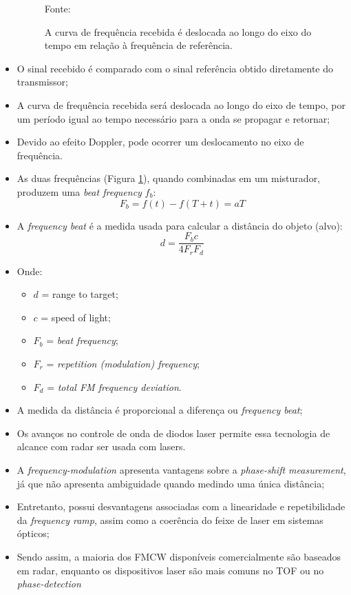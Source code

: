 \documentclass[xcolor=dvipsnames, aspectratio=169]{beamer}
\begin{document}
\begin{frame}
\begin{itemize}
\begin{figure}
            {Fonte: \cite{everett1995sensors}}
            \caption{A curva de frequência recebida é deslocada ao longo do eixo do tempo em relação à frequência de referência.}
            \label{fig:curva_de_freq}
        \end{figure}
        \item O sinal recebido é comparado com o sinal referência obtido diretamente do transmissor;
        \item A curva de frequência recebida será deslocada ao longo do eixo de tempo, por um período igual ao tempo necessário para a onda se propagar e retornar;
        \item Devido ao efeito Doppler, pode ocorrer um deslocamento no eixo de frequência.
        \item As duas frequências (Figura \ref{fig:curva_de_freq}), quando combinadas em um misturador, produzem uma \textit{beat frequency} $f_{b}$:
        \begin{equation}
            F_{b} = f(t) - f(T + t) = aT
        \end{equation}
        \item A \textit{frequency beat} é a medida usada para calcular a distância do objeto (alvo):
        \begin{equation}
            d = \frac{F_{b}c}{4F_{r}F{_d}}
        \end{equation}
        \item Onde:
        \begin{itemize}
            \item[] $d$ = range to target;
            \item[] $c$ = speed of light;
            \item[] $F_{b}$ = \textit{beat frequency};
            \item[] $F_{r}$ = \textit{repetition (modulation) frequency};
            \item[] $F_{d}$ = \textit{total FM frequency deviation}.
        \end{itemize}
        \item A medida da distância é proporcional a diferença ou \textit{frequency beat};
        \item Os avanços no controle de onda de diodos laser permite essa tecnologia de alcance com radar ser usada com lasers.
        \item A \textit{frequency-modulation} apresenta vantagens sobre a \textit{phase-shift measurement}, já que não apresenta ambiguidade quando medindo uma única distância;
        \item Entretanto, possui desvantagens associadas com a linearidade e repetibilidade da \textit{frequency ramp}, assim como a coerência do feixe de laser em sistemas ópticos;
        \item Sendo assim, a maioria dos FMCW disponíveis comercialmente são baseados em radar, enquanto os dispositivos laser são mais comuns no TOF ou no \textit{phase-detection}
	\end{itemize}
\end{frame}
\end{document}
